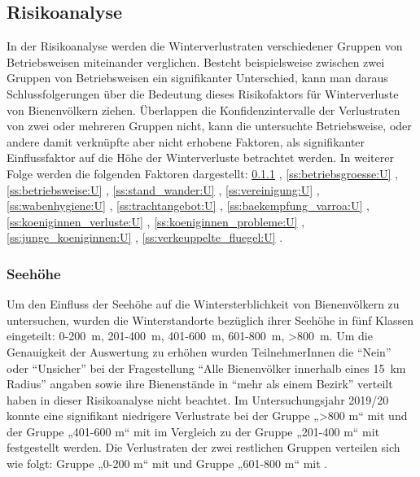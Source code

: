 \subsection{Risikoanalyse}

In der Risikoanalyse werden die Winterverlustraten verschiedener Gruppen von Betriebsweisen miteinander verglichen. Besteht beispielsweise zwischen zwei Gruppen von Betriebsweisen ein signifikanter Unterschied, kann man daraus Schlussfolgerungen über die Bedeutung dieses Risikofaktors für Winterverluste von Bienenvölkern ziehen. Überlappen die Konfidenzintervalle der Verlustraten von zwei oder mehreren Gruppen nicht, kann die untersuchte Betriebsweise, oder andere damit verknüpfte aber nicht erhobene Faktoren, als signifikanter Einflussfaktor auf die Höhe der Winterverluste betrachtet werden. In weiterer Folge werden die folgenden Faktoren dargestellt:
\ref{ss:seehoehe:U} ,
\ref{ss:betriebsgroesse:U} ,
\ref{ss:betriebsweise:U} ,
\ref{ss:stand_wander:U} ,
\ref{ss:vereinigung:U} ,
\ref{ss:wabenhygiene:U} ,
\ref{ss:trachtangebot:U} ,
\ref{ss:baekempfung_varroa:U} ,
\ref{ss:koeniginnen_verluste:U} ,
\ref{ss:koeniginnen_probleme:U} ,
\ref{ss:junge_koeniginnen:U} ,
\ref{ss:verkeuppelte_fluegel:U} .


\subsubsection{Seehöhe}
\label{ss:seehoehe:U}

Um den Einfluss der Seehöhe auf die Wintersterblichkeit von Bienenvölkern zu untersuchen, wurden die Winterstandorte bezüglich ihrer Seehöhe in fünf Klassen eingeteilt: 0-200~m, 201-400~m, 401-600~m, 601-800~m, >800~m. Um die Genauigkeit der Auswertung zu erhöhen wurden TeilnehmerInnen die \enquote{Nein} oder \enquote{Unsicher} bei der Fragestellung \enquote{Alle Bienenvölker innerhalb eines \SI{15}{\kilo\meter} Radius} angaben sowie ihre Bienenstände in \enquote{mehr als einem Bezirk} verteilt haben in dieser Risikoanalyse nicht beachtet.
\newline
Im Untersuchungsjahr 2019/20 konnte eine signifikant niedrigere Verlustrate bei der Gruppe „>800 m`` mit  und der Gruppe „401-600 m`` mit  im Vergleich zu der Gruppe „201-400 m`` mit 
festgestellt werden.
\newline
Die Verlustraten der zwei restlichen Gruppen verteilen sich wie folgt: Gruppe „0-200 m`` mit  und Gruppe „601-800 m`` mit .

